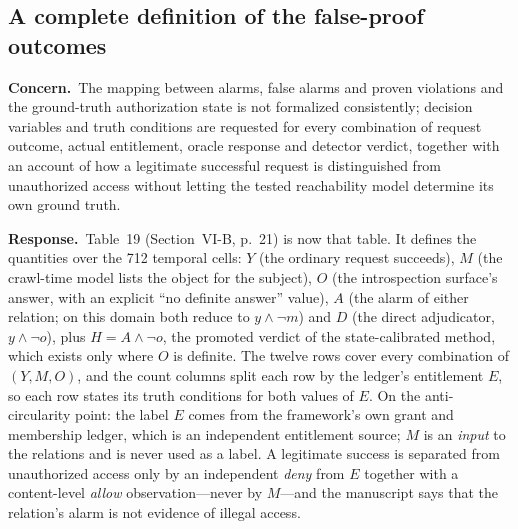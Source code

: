\documentclass[10pt,letterpaper]{article}
\newcommand{\Concern}[1]{\par\smallskip\noindent\textbf{Concern.}\ #1\par}
\newcommand{\Response}[1]{\par\smallskip\noindent\textbf{Response.}\ #1\par}
\begin{document}
\subsection{A complete definition of the false-proof outcomes}
\Concern{The mapping between alarms, false alarms and proven violations and the
ground-truth authorization state is not formalized consistently; decision
variables and truth conditions are requested for every combination of request
outcome, actual entitlement, oracle response and detector verdict, together with
an account of how a legitimate successful request is distinguished from
unauthorized access without letting the tested reachability model determine its
own ground truth.}
\Response{Table~19 (Section~VI-B, p.~21) is now that table. It defines the
quantities over the 712 temporal cells: $Y$ (the ordinary request succeeds), $M$
(the crawl-time model lists the object for the subject), $O$ (the introspection
surface's answer, with an explicit ``no definite answer'' value), $A$ (the alarm
of either relation; on this domain both reduce to $y\wedge\neg m$) and $D$ (the
direct adjudicator, $y\wedge\neg o$), plus $H=A\wedge\neg o$, the promoted verdict
of the state-calibrated method, which exists only where $O$ is definite. The
twelve rows cover every combination of $(Y,M,O)$, and the count columns split
each row by the ledger's entitlement $E$, so each row states its truth conditions
for both values of $E$. On the anti-circularity point: the label $E$ comes from
the framework's own grant and membership ledger, which is an independent
entitlement source; $M$ is an \emph{input} to the relations and is never used as
a label. A legitimate success is separated from unauthorized access only by an
independent \emph{deny} from $E$ together with a content-level \emph{allow}
observation---never by $M$---and the manuscript says that the relation's alarm
is not evidence of illegal access.}
\end{document}
